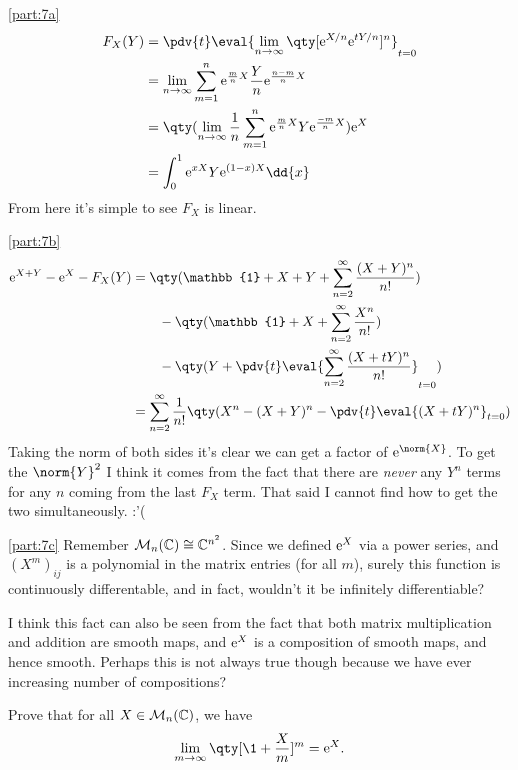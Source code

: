 \documentclass[
	pages,
	boxes,
	color=WildStrawberry
]{homework}
\begin{document}
\begin{solution}
	\ref{part:7a}
	\begin{align*}
		F_X(Y) & = \pdv{t}\eval{\lim_{n\to\infty}\qty[\e^{X/n}\e^{tY/n}]^n}_{t=0}                                 \\
		       & = \lim_{n\to\infty}\sum_{m = 1}^{n}\e^{\frac{m}{n}X}\frac{Y}{n}\e^{\frac{n - m}{n}X}             \\
		       & = \qty(\lim_{n\to\infty}\frac{1}{n}\sum_{m = 1}^{n}\e^{\frac{m}{n}X} Y \e^{\frac{-m}{n}X})\e^{X} \\
		       & = \int_0^1\e^{xX}Y\e^{(1-x)X}\dd{x}
	\end{align*}
	From here it's simple to see $F_X$ is linear.

	\ref{part:7b}
	\begin{align*}
		\e^{X + Y} - \e^{X} - F_X(Y) & = \qty(\mathbb{1} + X + Y + \sum_{n = 2}^\infty\frac{(X+Y)^n}{n!})                  \\
		                             & \qquad - \qty(\mathbb{1} + X + \sum_{n = 2}^\infty\frac{X^n}{n!})                   \\
		                             & \qquad - \qty(Y + \pdv{t}\eval{\sum_{n = 2}^\infty\frac{(X + tY)^n}{n!}}_{t=0})     \\
		                             & = \sum_{n=2}^\infty\frac{1}{n!}\qty(X^n - (X+Y)^n - \pdv{t}\eval{(X + tY)^n}_{t=0})
	\end{align*}
	Taking the norm of both sides it's clear we can get a factor of $\e^{\norm{X}}$. To get the $\norm{Y}^2$ I think it comes from the fact that there are \emph{never} any $Y^n$ terms for any $n$ coming from the last $F_X$ term. That said I cannot find how to get the two simultaneously. :'(

	\ref{part:7c}
	Remember $\mathcal{M}_{n}(\mathbb{C})\cong \mathbb{C}^{n^2}$. Since we defined $\mathrm{e}^{X}$ via a power series, and $(X^m)_{ij}$ is a polynomial in the matrix entries (for all $m$), surely this function is continuously differentable, and in fact, wouldn't it be infinitely differentiable?

	I think this fact can also be seen from the fact that both matrix multiplication and addition are smooth maps, and $\mathrm{e}^{X}$ is a composition of smooth maps, and hence smooth. Perhaps this is not always true though because we have ever increasing number of compositions?
\end{solution}

\begin{problem}
Prove that for all $X\in\mathcal{M}_{n}(\mathbb{C})$, we have \[\lim_{m\to\infty}\qty[\1 + \frac{X}{m}]^m = \e^X.\]
\end{problem}
\end{document}
